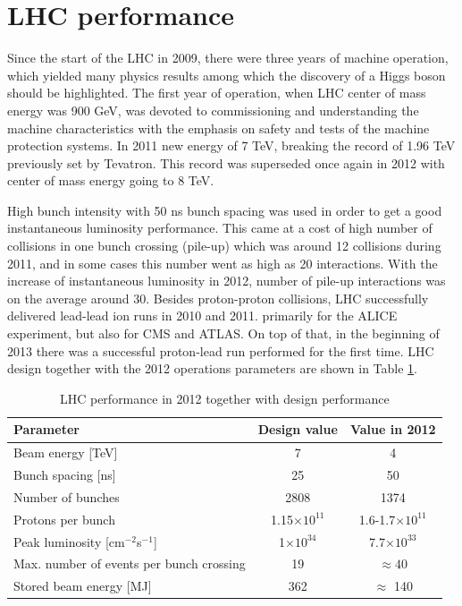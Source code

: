 
\section{LHC performance}

Since the start of the LHC in 2009, there were three years of machine operation, which yielded many physics results among which the discovery of a Higgs boson should be highlighted. The first year of operation, when LHC center of mass energy was 900 GeV, was devoted to commissioning and understanding the machine characteristics with the emphasis on safety and tests of the machine protection systems. In 2011 new energy of 7 TeV, breaking the record of 1.96 TeV previously set by Tevatron. This record was superseded once again in 2012 with center of mass energy going to 8 TeV.
\par High bunch intensity with 50 ns bunch spacing was used in order to get a good instantaneous luminosity performance. This came at a cost of high number of collisions in one bunch crossing (pile-up) which was around 12 collisions during 2011, and in some cases this number went as high as 20 interactions. With the increase of instantaneous luminosity in 2012, number of pile-up interactions was on the average around 30. Besides proton-proton collisions, LHC successfully delivered lead-lead ion runs in 2010 and 2011. primarily for the ALICE experiment, but also for CMS and ATLAS. On top of that, in the beginning of 2013 there was a successful proton-lead run performed for the first time. LHC design together with the 2012 operations parameters are shown in Table \ref{tab:LHC_design}. 

\begin{table}[h]
\centering
  \caption{LHC performance in 2012 together with design performance\cite{Evans:2008zzb}}
	\label{tab:LHC_design}
  \begin{tabular}{ l  c  c }
      \hline
      \hline
      Parameter & Design value & Value in 2012 \\
      \hline
      Beam energy [TeV] & 7 & 4 \\
      Bunch spacing [ns] & 25 & 50 \\
      Number of bunches & 2808 & 1374 \\
      Protons per bunch & 1.15$\times 10^{11}$ & 1.6-1.7$\times 10^{11}$ \\
      Peak luminosity [cm$^{-2}$s$^{-1}$] & 1$\times 10^{34}$ & 7.7$\times 10^{33}$ \\
      Max. number of events per bunch crossing & 19 & $\approx 40$ \\
      Stored beam energy [MJ] & 362 & $\approx$ 140 \\
      \hline
      \hline 
  \end{tabular}
\end{table}

